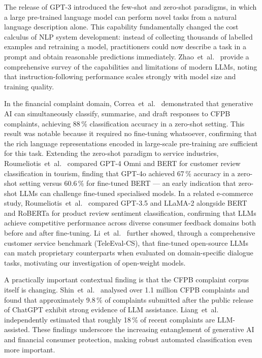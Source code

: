\documentclass[journal]{IEEEtran}
\begin{document}
The release of GPT-3 \cite{brown2020gpt3} introduced the few-shot and
zero-shot paradigms, in which a large pre-trained language model can
perform novel tasks from a natural language description alone. This
capability fundamentally changed the cost calculus of NLP system
development: instead of collecting thousands of labelled examples and
retraining a model, practitioners could now describe a task in a
prompt and obtain reasonable predictions immediately. Zhao~et~al.\
\cite{zhao2023survey} provide a comprehensive survey of the capabilities
and limitations of modern LLMs, noting that instruction-following
performance scales strongly with model size and training quality.

In the financial complaint domain, Correa~et~al.\ \cite{correa2024genai}
demonstrated that generative AI can simultaneously classify, summarise,
and draft responses to CFPB complaints, achieving 88\,\% classification
accuracy in a zero-shot setting. This result was notable because it
required no fine-tuning whatsoever, confirming that the rich language
representations encoded in large-scale pre-training are sufficient for
this task. Extending the zero-shot paradigm to service industries,
Roumeliotis~et~al.\ \cite{roumeliotis2024tourism} compared GPT-4 Omni
and BERT for customer review classification in tourism, finding that
GPT-4o achieved 67\,\% accuracy in a zero-shot setting versus 60.6\,\%
for fine-tuned BERT — an early indication that zero-shot LLMs can
challenge fine-tuned specialised models.
In a related e-commerce study, Roumeliotis~et~al.\ \cite{roumeliotis2024ecommerce}
compared GPT-3.5 and LLaMA-2 alongside BERT and RoBERTa for product review
sentiment classification, confirming that LLMs achieve competitive performance
across diverse consumer feedback domains both before and after fine-tuning.
Li~et~al.\
\cite{li2024customerservice} further showed, through a comprehensive
customer service benchmark (TeleEval-CS), that fine-tuned open-source
LLMs can match proprietary counterparts when evaluated on
domain-specific dialogue tasks, motivating our investigation of
open-weight models.

A practically important contextual finding is that the CFPB complaint
corpus itself is changing. Shin~et~al.\ \cite{shin2025llmwritten}
analysed over 1.1 million CFPB complaints and found that approximately
9.8\,\% of complaints submitted after the public release of ChatGPT
exhibit strong evidence of LLM assistance. Liang~et~al.\
\cite{liang2025cfpb} independently estimated that roughly 18\,\% of
recent complaints are LLM-assisted. These findings underscore the
increasing entanglement of generative AI and financial consumer
protection, making robust automated classification even more important.
\end{document}
